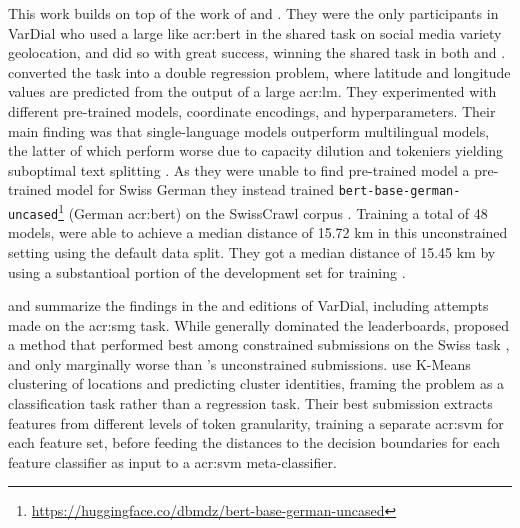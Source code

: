 This work builds on top of the work of \cite{scherrerHeLjuVarDial20202020} and \cite{scherrerSocialMediaVariety2021}. They were the only participants in VarDial who used a large  like \acrshort{acr:bert} in the shared task on social media variety geolocation, and did so with great success, winning the shared task in both \citeyear{scherrerHeLjuVarDial20202020} and \citeyear{scherrerSocialMediaVariety2021}. \citeauthor{scherrerHeLjuVarDial20202020} converted the task into a double regression problem, where latitude and longitude values are predicted from the output of a large \acrshort{acr:lm}. They experimented with different pre-trained models, coordinate encodings, and hyperparameters. Their main finding was that single-language models outperform multilingual models, the latter of which perform worse due to capacity dilution and tokeniers yielding suboptimal text splitting \citep[3]{scherrerHeLjuVarDial20202020}. As they were unable to find pre-trained model a pre-trained model for Swiss German they instead trained \texttt{bert-base-german-uncased}\footnote{\url{https://huggingface.co/dbmdz/bert-base-german-uncased}} (German \acrshort{acr:bert}) on the SwissCrawl corpus \citep{linderAutomaticCreationText2020}. Training a total of 48 models, \citeauthor{scherrerHeLjuVarDial20202020} were able to achieve a median distance of 15.72 km in this unconstrained setting using the default data split. They got a median distance of 15.45 km by using a substantioal portion of the development set for training \citep[6]{scherrerHeLjuVarDial20202020}.

\cite{gamanReportVarDialEvaluation2020} and \cite{chakravarthiFindingsVarDialEvaluation2021} summarize the findings in the \citeyear{gamanReportVarDialEvaluation2020} and \citeyear{chakravarthiFindingsVarDialEvaluation2021} editions of VarDial, including attempts made on the \gls{acr:smg} task. While \cite{scherrerHeLjuVarDial20202020} generally dominated the leaderboards, \cite{benitesdeazevedoesouzaZHAWInITSocialMedia2020} proposed a method that performed best among constrained submissions on the Swiss task \citep[8-9]{gamanReportVarDialEvaluation2020}, and only marginally worse than \citeauthor{scherrerHeLjuVarDial20202020}'s unconstrained submissions. \cite{benitesdeazevedoesouzaZHAWInITSocialMedia2020} use K-Means clustering \citep{lloydLeastSquaresQuantization1982a} of locations and predicting cluster identities, framing the problem as a classification task rather than a regression task. Their best submission extracts features from different levels of token granularity, training a separate \acrshort{acr:svm} for each feature set, before feeding the distances to the decision boundaries for each feature classifier as input to a \acrshort{acr:svm} meta-classifier.